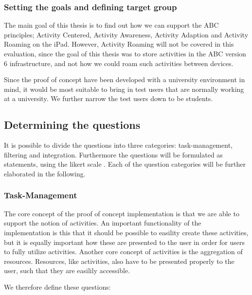 \subsubsection{Setting the goals and defining target group}
The main goal of this thesis is to find out how we can support the ABC principles; Activity Centered, Activity Awareness, Activity Adaption and Activity Roaming on the iPad. However, Activity Roaming will not be covered in this evaluation, since the goal of this thesis was to store activities in the ABC version 6 infrastructure, and not how we could roam such activities between devices.

Since the proof of concept have been developed with a university environment in mind, it would be most suitable to bring in test users that are normally working at a university. We further narrow the test users down to be students.

\subsection{Determining the questions}
It is possible to divide the questions into three categories: task-management, filtering and integration. Furthermore the questions will be formulated as statements, using the likert scale \citep{likert}. Each of the question categories will be further elaborated in the following.

\subsubsection{Task-Management}
The core concept of the proof of concept implementation is that we are able to support the notion of activities. An important functionality of the implementation is this that it should be possible to easility create these activities, but it is equally important how these are presented to the user in order for users to fully utilize activities. Another core concept of activities is the aggregation of resources. Resources, like activities, also have to be presented properly to the user, such that they are easilily accessible. 

We therefore define these questions:

